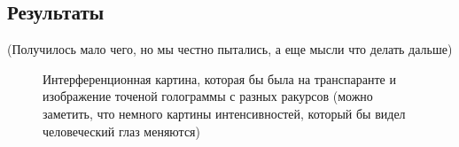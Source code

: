 \documentclass[aps,twocolumn,secnumarabic,balancelastpage,amsmath,amssymb,nofootinbib, floatfix]{revtex4-1}
\begin{document}
\subsection{Результаты}
(Получилось мало чего, но мы честно пытались, а еще мысли что делать дальше)
\begin{figure}[htbp]
	\centering
	\quad
	\quad
	\quad
	\caption{Интерференционная картина, которая бы была на транспаранте и изображение точеной голограммы с разных ракурсов (можно заметить, что немного картины интенсивностей, который бы видел человеческий глаз меняются)}
	\label{fig:point_hologram}
\end{figure}
\end{document}
